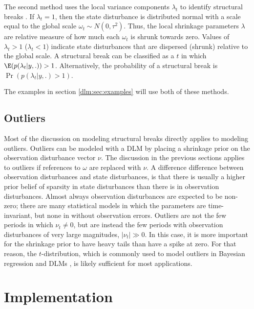 The second method uses the local variance components $\lambda_{t}$ to identify structural breaks \parencite[179-180]{PetrisPetroneEtAl2009}.
If $\lambda_{t} = 1$, then the state disturbance is distributed normal with a scale equal to the global scale $\omega_{t} \sim N(0, \tau^{2})$.
Thus, the local shrinkage parameters $\lambda$ are relative measure of how much each $\omega_{t}$ is shrunk towards zero.
Values of $\lambda_{t} > 1$ ($\lambda_{t} < 1$) indicate state disturbances that are dispersed (shrunk) relative to the global scale.
A structural break can be classified as a $t$ in which $\E (p(\lambda_{t} | y, .)) > 1$.
Alternatively, the probability of a structural break is $\Pr(p(\lambda_{t} | y, .) > 1)$.

The examples in section \ref{dlm:sec:examples} will use both of these methods.

\subsection{Outliers}
\label{dlm:sec:outliers}

Most of the discussion on modeling structural breaks directly applies to modeling outliers.
Outliers can be modeled with a DLM by placing a shrinkage prior on the observation disturbance vector $\nu$. 
The discussion in the previous sections applies to outliers if references to $\omega$ are replaced with $\nu$.
A difference difference between observation disturbances and state disturbances, is that there is usually a higher prior belief of sparsity in state disturbances than there is in observation disturbances.
Almost always observation disturbances are expected to be non-zero;
there are many statistical models in which the parameters are time-invariant, but none in without observation errors.%
Outliers are not the few periods in which $\nu_{t} \neq 0$, but are instead the few periods with observation disturbances of very large magnitudes, $|\nu_{t}| \gg 0$.
In this case, it is more important for the shrinkage prior to have heavy tails than have a spike at zero. 
For that reason, the $t$-distribution, which is commonly used to model
outliers in Bayesian regression and DLMs \parencite{West1984}, is
likely sufficient for most applications.

\section{Implementation}
\label{dlm:sec:implementation}

